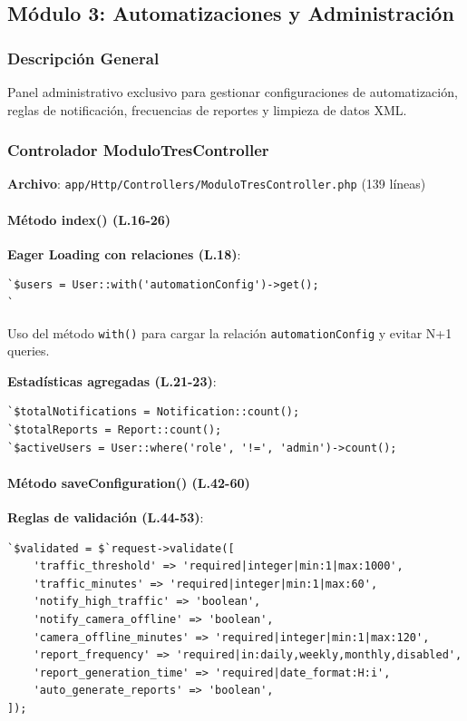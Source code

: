 \subsection{Módulo 3: Automatizaciones y Administración}

\subsubsection{Descripción General}

Panel administrativo exclusivo para gestionar configuraciones de automatización, reglas de notificación, frecuencias de reportes y limpieza de datos XML.

\subsubsection{Controlador ModuloTresController}

\textbf{Archivo}: \texttt{app/Http/Controllers/ModuloTresController.php} (139 líneas)

\paragraph{Método index() (L.16-26)}

\textbf{Eager Loading con relaciones (L.18)}:
\begin{lstlisting}[style=phpstyle]
`$users = User::with('automationConfig')->get();
`\end{lstlisting}

Uso del método \texttt{with()} para cargar la relación \texttt{automationConfig} y evitar N+1 queries.

\textbf{Estadísticas agregadas (L.21-23)}:
\begin{lstlisting}[style=phpstyle]
`$totalNotifications = Notification::count();
`$totalReports = Report::count();
`$activeUsers = User::where('role', '!=', 'admin')->count();
\end{lstlisting}

\paragraph{Método saveConfiguration() (L.42-60)}

\textbf{Reglas de validación (L.44-53)}:
\begin{lstlisting}[style=phpstyle]
`$validated = $`request->validate([
    'traffic_threshold' => 'required|integer|min:1|max:1000',
    'traffic_minutes' => 'required|integer|min:1|max:60',
    'notify_high_traffic' => 'boolean',
    'notify_camera_offline' => 'boolean',
    'camera_offline_minutes' => 'required|integer|min:1|max:120',
    'report_frequency' => 'required|in:daily,weekly,monthly,disabled',
    'report_generation_time' => 'required|date_format:H:i',
    'auto_generate_reports' => 'boolean',
]);
\end{lstlisting}

